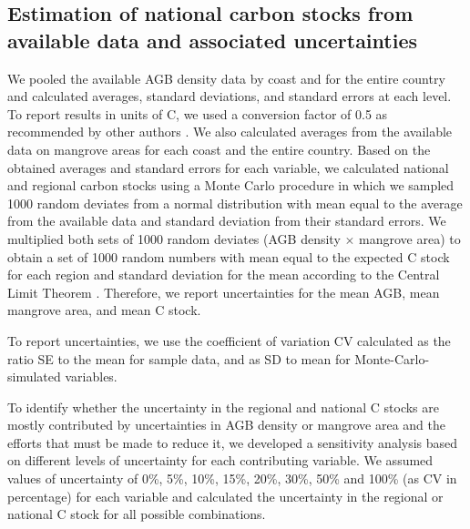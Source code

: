 \documentclass[review, authoryear]{elsarticle}   	%
\begin{document}
\subsection{Estimation of national carbon stocks from available data and associated uncertainties}
We pooled the available AGB density data by coast and for the entire country and calculated averages, standard deviations, and standard errors at each level. To report results in units of C, we used a conversion factor of 0.5 as recommended by other authors \citep{MacDicken1997, Clark2001, Fearnside2004, Chave2005, Aragao2009}. We also calculated averages from the available data on mangrove areas for each coast and the entire country. Based on the obtained averages and standard errors for each variable, we calculated national and regional carbon stocks using a Monte Carlo procedure in which we sampled 1000 random deviates from a normal distribution with mean equal to the average from the available data and standard deviation from their standard errors. We multiplied both sets of 1000 random deviates (AGB density $\times$ mangrove area) to obtain a set of 1000 random numbers with mean equal to the expected C stock for each region and standard deviation for the mean according to the Central Limit Theorem \citep[see also][]{Sierra2007}. Therefore, we report uncertainties for the mean AGB, mean mangrove area, and mean C stock.

To report uncertainties, we use the coefficient of variation CV calculated as the ratio SE to the mean for sample data, and as SD to mean for Monte-Carlo-simulated variables.

To identify whether the uncertainty in the regional and national C stocks are mostly contributed by uncertainties in AGB density or mangrove area and the efforts that must be made to reduce it, we developed a sensitivity analysis based on different levels of uncertainty for each contributing variable. We assumed values of uncertainty of 0\%, 5\%, 10\%, 15\%, 20\%, 30\%, 50\% and 100\% (as CV in percentage) for each variable and calculated the uncertainty in the regional or national C stock for all possible combinations.

\end{document}
